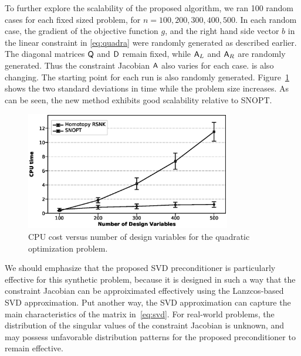 To further explore the scalability of the proposed algorithm, we ran 100 random cases for 
each fixed sized problem, for $n = 100, 200, 300, 400, 500$.  In each random case, the gradient 
of the objective function $g$, and the right hand side vector $b$ in the linear constraint in \eqref{eq:quadra} 
were randomly generated as described earlier. The diagonal matrices $\mathsf{Q}$ and $\mathsf{D}$ remain fixed, while $\mathsf{A}_L$ and $\mathsf{A}_R$ are randomly generated. Thus the constraint Jacobian $\mathsf{A}$ 
also varies for each case. 
is also changing. The starting point for each run is also randomly generated. Figure~\ref{fig:quad_scale} shows the two standard deviations in time while
the problem size increases. As can be seen, the new method exhibits good scalability relative to SNOPT. 

\begin{figure}[tbp]
  \centering
  \includegraphics[clip,width=0.8\textwidth]{./figs/chap4_test/quadratic_random_100_nocolor.eps}%
  \caption{CPU cost versus number of design variables for the quadratic
    optimization problem.\label{fig:quad_scale}}
\end{figure}

We should emphasize that the proposed SVD preconditioner is particularly effective for this synthetic problem, because it is designed in such a way that the constraint Jacobian can be approiximated effectively using the Lanzcos-based SVD approximation.
Put another way, the SVD approximation can capture the main characteristics of the matrix in~\eqref{eq:svd}. For real-world problems, the distribution of the singular values of the constraint Jacobian is unknown, and may possess unfavorable distribution patterns for the proposed preconditioner to remain effective.



